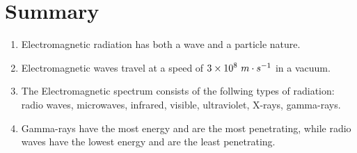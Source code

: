 \section{Summary}
            \nopagebreak
      \label{m38779*id189769}\begin{enumerate}[noitemsep, label=\textbf{\arabic*}. ] 
            \label{m38779*uid30}\item Electromagnetic radiation has both a wave and a particle nature.
\label{m38779*uid31}\item Electromagnetic waves travel at a speed of $3\ensuremath{\times}{10}^{8}\phantom{\rule{3.33333pt}{0ex}}m\ensuremath{\cdot}{s}^{-1}$ in a vacuum.
\label{m38779*uid32}\item The Electromagnetic spectrum consists of the follwing types of radiation: radio waves, microwaves, infrared, visible, ultraviolet, X-rays, gamma-rays.
\label{m38779*uid33}\item Gamma-rays have the most energy and are the most penetrating, while radio waves have the lowest energy and are the least penetrating.
\end{enumerate}
